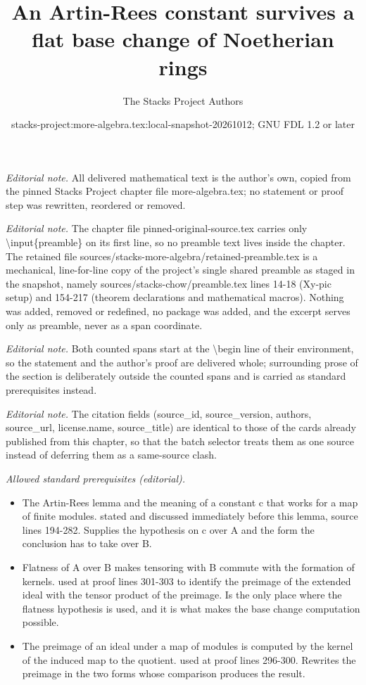 \documentclass[10pt,a4paper]{amsart}
\title{An Artin-Rees constant survives a flat base change of Noetherian rings}
\author{The Stacks Project Authors}
\date{stacks-project:more-algebra.tex:local-snapshot-20261012; GNU FDL 1.2 or later}
\theoremstyle{plain}
\theoremstyle{definition}
\theoremstyle{remark}
\numberwithin{equation}{subsection}
\begin{document}
\maketitle
\setcounter{subsection}{1}
\noindent\textit{Editorial note.} All delivered mathematical text is the author's own, copied from the pinned Stacks Project chapter file more-algebra.tex; no statement or proof step was rewritten, reordered or removed.\par\medskip
\noindent\textit{Editorial note.} The chapter file pinned-original-source.tex carries only \textbackslash{}input\{preamble\} on its first line, so no preamble text lives inside the chapter. The retained file sources/stacks-more-algebra/retained-preamble.tex is a mechanical, line-for-line copy of the project's single shared preamble as staged in the snapshot, namely sources/stacks-chow/preamble.tex lines 14-18 (Xy-pic setup) and 154-217 (theorem declarations and mathematical macros). Nothing was added, removed or redefined, no package was added, and the excerpt serves only as preamble, never as a span coordinate.\par\medskip
\noindent\textit{Editorial note.} Both counted spans start at the \textbackslash{}begin line of their environment, so the statement and the author's proof are delivered whole; surrounding prose of the section is deliberately outside the counted spans and is carried as standard prerequisites instead.\par\medskip
\noindent\textit{Editorial note.} The citation fields (source\_id, source\_version, authors, source\_url, license.name, source\_title) are identical to those of the cards already published from this chapter, so that the batch selector treats them as one source instead of deferring them as a same-source clash.\par\medskip
\noindent\textit{Allowed standard prerequisites (editorial).}\begin{itemize}
\item The Artin-Rees lemma and the meaning of a constant c that works for a map of finite modules. stated and discussed immediately before this lemma, source lines 194-282. Supplies the hypothesis on c over A and the form the conclusion has to take over B.
\item Flatness of A over B makes tensoring with B commute with the formation of kernels. used at proof lines 301-303 to identify the preimage of the extended ideal with the tensor product of the preimage. Is the only place where the flatness hypothesis is used, and it is what makes the base change computation possible.
\item The preimage of an ideal under a map of modules is computed by the kernel of the induced map to the quotient. used at proof lines 296-300. Rewrites the preimage in the two forms whose comparison produces the result.
\end{itemize}\medskip
\end{document}
